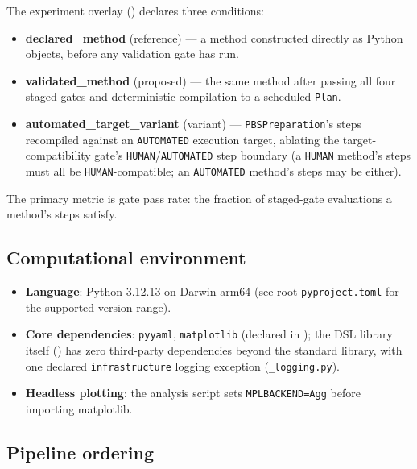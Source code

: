 \documentclass[
  english,
]{article}
\providecommand{\tightlist}{%
  \setlength{\itemsep}{0pt}\setlength{\parskip}{0pt}}
\begin{document}
The experiment overlay () declares three
conditions:

\begin{itemize}
\tightlist
\item
  \textbf{declared\_method} (reference) --- a method constructed
  directly as Python objects, before any validation gate has run.
\item
  \textbf{validated\_method} (proposed) --- the same method after
  passing all four staged gates and deterministic compilation to a
  scheduled \texttt{Plan}.
\item
  \textbf{automated\_target\_variant} (variant) ---
  \texttt{PBSPreparation}'s steps recompiled against an
  \texttt{AUTOMATED} execution target, ablating the target-compatibility
  gate's \texttt{HUMAN}/\texttt{AUTOMATED} step boundary (a
  \texttt{HUMAN} method's steps must all be \texttt{HUMAN}-compatible;
  an \texttt{AUTOMATED} method's steps may be either).
\end{itemize}

The primary metric is gate pass rate: the fraction of staged-gate
evaluations a method's steps satisfy.

\subsection{Computational environment}\label{computational-environment}

\begin{itemize}
\tightlist
\item
  \textbf{Language}: Python 3.12.13 on Darwin arm64 (see root
  \texttt{pyproject.toml} for the supported version range).
\item
  \textbf{Core dependencies}: \texttt{pyyaml}, \texttt{matplotlib}
  (declared in ); the
  DSL library itself () has zero third-party
  dependencies beyond the standard library, with one declared
  \texttt{infrastructure} logging exception (\texttt{\_logging.py}).
\item
  \textbf{Headless plotting}: the analysis script sets
  \texttt{MPLBACKEND=Agg} before importing matplotlib.
\end{itemize}

\subsection{Pipeline ordering}\label{pipeline-ordering}
\end{document}
